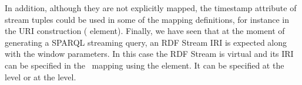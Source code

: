 In addition, although they are not explicitly mapped, the timestamp attribute of stream tuples could be used in some of the mapping definitions, for instance in the URI construction ( element).
Finally, we have seen that at the moment of generating a SPARQL streaming query, an RDF Stream IRI is expected along with the window parameters. In this case the RDF Stream is virtual and its IRI can be specified in the \stwoo\ mapping using the  element. It can be specified at the  level or at the  level.




